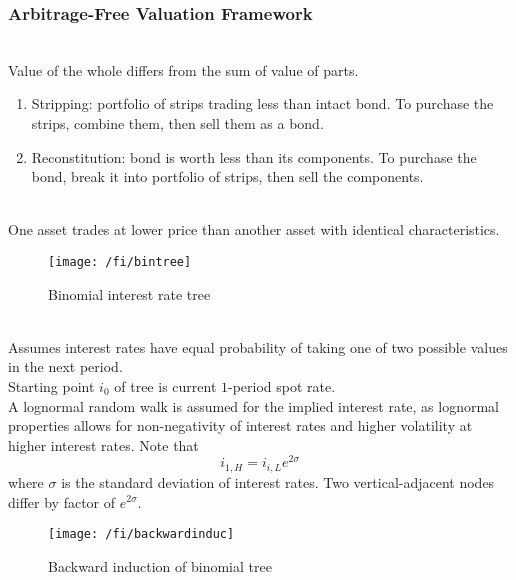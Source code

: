 \subsubsection{Arbitrage-Free Valuation Framework}

\begin{definition} \\
Value of the whole differs from the sum of value of parts.
\begin{enumerate}[label=\roman*.]
\setlength{\itemsep}{0pt}
\item Stripping: portfolio of strips trading less than intact bond. To purchase the strips, combine them, then sell them as a bond.
\item Reconstitution: bond is worth less than its components. To purchase the bond, break it into portfolio of strips, then sell the components.
\end{enumerate}
\end{definition}

\begin{definition} \\
One asset trades at lower price than another asset with identical characteristics.
\end{definition}

\begin{figure}[H]
\centering
\texttt{[image: /fi/bintree]}
\caption{Binomial interest rate tree}
\end{figure}

\begin{method} \\
Assumes interest rates have equal probability of taking one of two possible values in the next period.\\
Starting point $i_0$ of tree is current $1$-period spot rate.\\
A lognormal random walk is assumed for the implied interest rate, as lognormal properties allows for non-negativity of interest rates and higher volatility at higher interest rates. Note that
\begin{equation}
i_{1, H} = i_{i,L} e^{2 \sigma} \nonumber
\end{equation}
where $\sigma$ is the standard deviation of interest rates. Two vertical-adjacent nodes differ by factor of $e^{2 \sigma}$.
\end{method}

\begin{figure}[H]
\centering
\texttt{[image: /fi/backwardinduc]}
\caption{Backward induction of binomial tree}
\end{figure}

